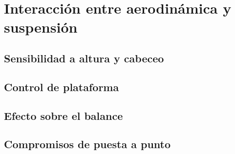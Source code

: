 \chapter{Interacción entre aerodinámica y suspensión}
\label{ch:interaccion_aero_suspension}

\begin{objetivos}
  \item {}
  \item {}
  \item {}
\end{objetivos}


\section{Sensibilidad a altura y cabeceo}
\label{sec:interaccion_aero_suspension:01}

\section{Control de plataforma}
\label{sec:interaccion_aero_suspension:02}

\section{Efecto sobre el balance}
\label{sec:interaccion_aero_suspension:03}

\section{Compromisos de puesta a punto}
\label{sec:interaccion_aero_suspension:04}


\begin{caso}
\end{caso}

